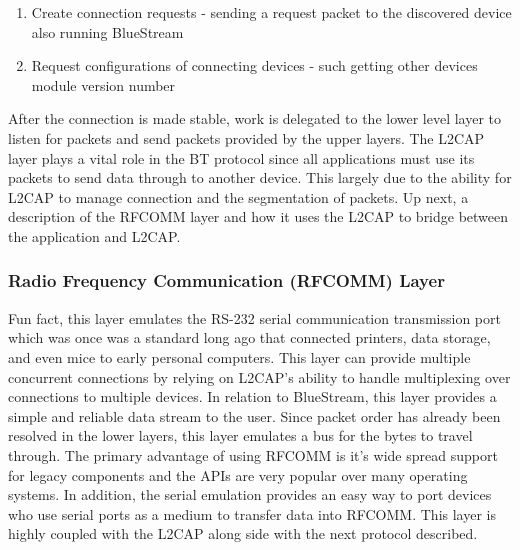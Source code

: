 \documentclass[a4paper,12pt]{article}
\begin{document}
\begin{enumerate}
\item Create connection requests - sending a request packet to the discovered device also running BlueStream
\item Request configurations of connecting devices - such getting other devices module version number
\end{enumerate}

After the connection is made stable, work is delegated to the lower level layer to listen for packets and send packets provided by the upper layers. The L2CAP layer plays a vital role in the BT protocol since all applications must use its packets to send data through to another device. This largely due to the ability for L2CAP to manage connection and the segmentation of packets. Up next, a description of the RFCOMM layer and how it uses the L2CAP to bridge between the application and L2CAP. 

\subsubsection{Radio Frequency Communication (RFCOMM) Layer}
Fun fact, this layer emulates the RS-232 serial communication transmission port which was once was a standard long ago that connected printers, data storage, and even mice to early personal computers. This layer can provide multiple concurrent connections by relying on L2CAP’s ability to handle multiplexing over connections to multiple devices. In relation to BlueStream, this layer provides a simple and reliable data stream to the user. Since packet order has already been resolved in the lower layers, this layer emulates a bus for the bytes to travel through. The primary advantage of using RFCOMM is it’s wide spread support for legacy components and the APIs are very popular over many operating systems. In addition, the serial emulation provides an easy way to port devices who use serial ports as a medium to transfer data into RFCOMM. This layer is highly coupled with the L2CAP along side with the next protocol described. 
\end{document}
